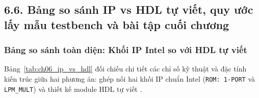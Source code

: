 \subsection*{6.6. Bảng so sánh IP vs HDL tự viết, quy ước lấy mẫu testbench và bài tập cuối chương}

\subsubsection*{Bảng so sánh toàn diện: Khối IP Intel so với HDL tự viết}
Bảng~\ref{tab:ch06_ip_vs_hdl} đối chiếu chi tiết các chỉ số kỹ thuật và đặc tính kiến trúc giữa hai phương án: ghép nối hai khối IP chuẩn Intel (\texttt{ROM: 1-PORT} và \texttt{LPM\_MULT}) và thiết kế module HDL tự viết .

